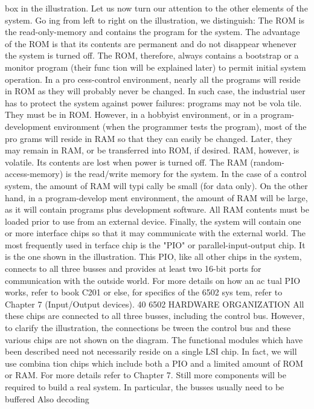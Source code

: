 \documentclass{book}
\begin{document}
box in the illustration.
Let us now turn our attention to the other elements of the system. Go
ing from left to right on the illustration, we distinguish:
The ROM is the read-only-memory and contains the program for the
system. The advantage of the ROM is that its contents are permanent
and do not disappear whenever the system is turned off. The ROM,
therefore, always contains a bootstrap or a monitor program (their func
tion will be explained later) to permit initial system operation. In a pro
cess-control environment, nearly all the programs will reside in ROM as
they will probably never be changed. In such case, the industrial user has
to protect the system against power failures: programs may not be vola
tile. They must be in ROM.
However, in a hobbyist environment, or in a program-development
environment (when the programmer tests the program), most of the pro
grams will reside in RAM so that they can easily be changed. Later, they
may remain in RAM, or be transferred into ROM, if desired. RAM,
however, is volatile. Its contents are lost when power is turned off.
The RAM (random-access-memory) is the read/write memory for the
system. In the case of a control system, the amount of RAM will typi
cally be small (for data only). On the other hand, in a program-develop
ment environment, the amount of RAM will be large, as it will contain
programs plus development software. All RAM contents must be loaded
prior to use from an external device.
Finally, the system will contain one or more interface chips so that it
may communicate with the external world. The most frequently used in
terface chip is the "PIO" or parallel-input-output chip. It is the one
shown in the illustration. This PIO, like all other chips in the system,
connects to all three busses and provides at least two 16-bit ports for
communication with the outside world. For more details on how an ac
tual PIO works, refer to book C201 or else, for specifics of the 6502 sys
tem, refer to Chapter 7 (Input/Output devices).
40
6502 HARDWARE ORGANIZATION
All these chips are connected to all three busses, including the
control bus. However, to clarify the illustration, the connections be
tween the control bus and these various chips are not shown on the
diagram.
The functional modules which have been described need not
necessarily reside on a single LSI chip. In fact, we will use combina
tion chips which include both a PIO and a limited amount of ROM
or RAM. For more details refer to Chapter 7.
Still more components will be required to build a real system. In
particular, the busses usually need to be buffered Also decoding
\end{document}
